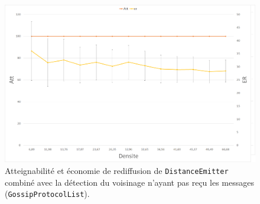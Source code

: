 \documentclass[a4paper]{article}
\begin{document}
\begin{figure}[H]
\begin{minipage}{\textwidth}
  \centering
    \includegraphics[width=\textwidth]{images/ex2x8.png}
    \caption{Atteignabilité et économie de rediffusion de
      \texttt{DistanceEmitter} combiné avec la détection du voisinage
      n'ayant pas reçu les messages (\texttt{GossipProtocolList}).}
\end{minipage}
\end{figure}


\pagebreak
\end{document}
